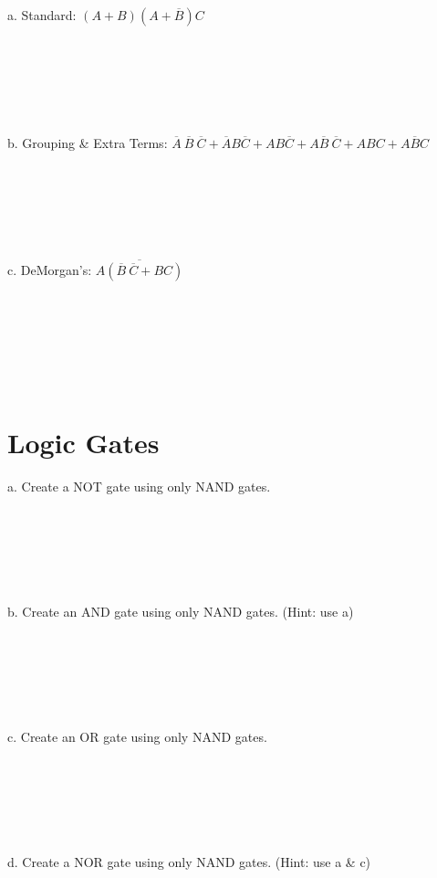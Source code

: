 \documentclass{article}
\begin{document}
\noindent a. Standard: $(A+B)(A+\overline{B})C$
~\\
~\\
~\\
~\\
~\\
~\\
~\\

\noindent b. Grouping \& Extra Terms: $\overline{A} \ \overline{B} \ \overline{C}+\overline{A}B\overline{C}+AB\overline{C}+A\overline{B} \ \overline{C}+ABC+A\overline{B}C$
~\\
~\\
~\\
~\\
~\\
~\\
~\\

\noindent c. DeMorgan's: $\overline{A(\overline{B} \ \overline{C}+BC)}$
~\\
~\\
~\\
~\\
~\\
~\\
~\\


\section{Logic Gates}
a. Create a NOT gate using only NAND gates.
~\\
~\\
~\\
~\\
~\\
~\\
~\\
\noindent b. Create an AND gate using only NAND gates.
\noindent (Hint: use a)
~\\
~\\
~\\
~\\
~\\
~\\
~\\
\noindent c. Create an OR gate using only NAND gates.
~\\
~\\
~\\
~\\
~\\
~\\
~\\
\noindent d. Create a NOR gate using only NAND gates.
\noindent (Hint: use a \& c)
~\\
~\\
~\\
~\\
~\\
~\\
~\\
\end{document}
